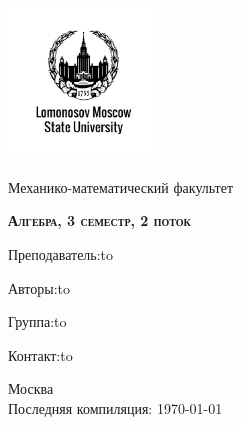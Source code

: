 \begin{titlepage}
  \newpage
  \begin{center}
  \includegraphics[width=4cm]{image/image.png}
  \end{center}
  \vspace{4em}
  
  \begin{center}
  \Large Механико-математический факультет  
  \end{center}
  \vspace{2em}
  
  \begin{center}
  \large{\textsc{\textbf{Алгебра, 3 семестр, 2 поток}}}
  \end{center}
  \vspace{6em}
  
  \newbox{\lbox}
  \newlength{\maxl}
  \setlength{\maxl}{\wd\lbox}
  \hfill\parbox{9cm}
  {
  Преподаватель:\hfill\hbox to \vspace{0.5cm}
  
  Авторы:\hfill\hbox to\vspace{0.15cm}

  Группа:\hfill\hbox to\vspace{0.5cm}
  
  Контакт:\hfill\hbox to\vspace{0.5cm}
  }

  \vspace{\fill}
  \begin{center}
  Москва \\Последняя компиляция: \today
  \end{center}
  
\end{titlepage}